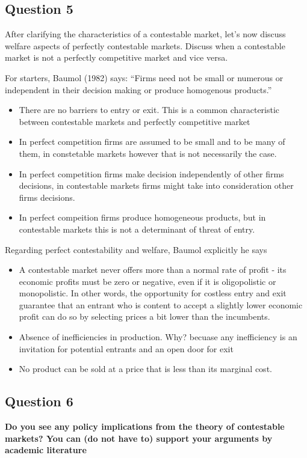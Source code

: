 \documentclass[11pt]{article} %
\begin{document}
\subsection{Question 5}
After clarifying the characteristics of a contestable market, let's now discuss welfare aspects of perfectly contestable markets. Discuss when a contestable market is not a perfectly competitive market and vice versa.

For starters, Baumol (1982) says: ``Firms need not be small or numerous or independent in their decision making or produce homogenous products.''  

\begin{itemize}
	\item There are no barriers to entry or exit. This is a common characteristic between contestable markets and perfectly competitive market
	\item In perfect competition firms are assumed to be small and to be many of them, in constetable markets however that is not necessarily the case.
	\item In perfect competition firms make decision independently of other firms decisions, in contestable markets firms might take into consideration other firms decisions.
	\item In perfect compeition firms produce homogeneous products, but in contestable markets this is not a determinant of threat of entry.
\end{itemize}

Regarding perfect contestability and welfare, Baumol explicitly he says

\begin{itemize}
	\item A contestable market never offers more than a normal rate of profit - its economic profits must be zero or negative, even if it is oligopolistic or monopolistic. In other words, the opportunity for costless entry and exit guarantee that an entrant who is content to accept a slightly lower economic profit can do so by selecting prices a bit lower than the incumbents.
	\item Absence of inefficiencies in production. Why? becuase any inefficiency is an invitation for potential entrants and an open door for exit
	\item No product can be sold at a price that is less than its marginal cost.
\end{itemize}

\subsection{Question 6}
\textbf{Do you see any policy implications from the theory of contestable markets? You can (do not have to) support your arguments by academic literature}
\end{document}
